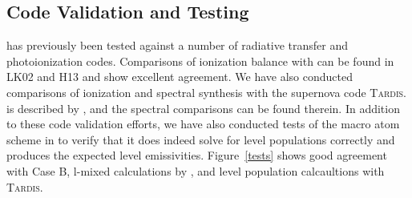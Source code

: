 \documentclass[preprint, a4paper, 11pt]{aastex}
\begin{document}
\subsection{Code Validation and Testing}

\py has previously been tested against a number of radiative transfer and
photoionization codes. Comparisons of ionization balance with \cld \citep{cloudy2013} 
can be found in LK02 and H13 and show excellent agreement. We have also conducted comparisons
of ionization and spectral synthesis with the supernova code \textsc{Tardis.} \tar is described by
\cite{kerzendorfsim}, and the spectral comparisons can be found therein.
In addition to these code validation efforts, we have also conducted tests of
the macro atom scheme in \py to verify that it does indeed solve for level populations correctly
and produces the expected level emissivities. Figure~\ref{tests} shows good agreement with 
Case B, l-mixed calculations by \cite{seaton1959}, and level
population calcaultions with \textsc{Tardis.}


\end{document}
